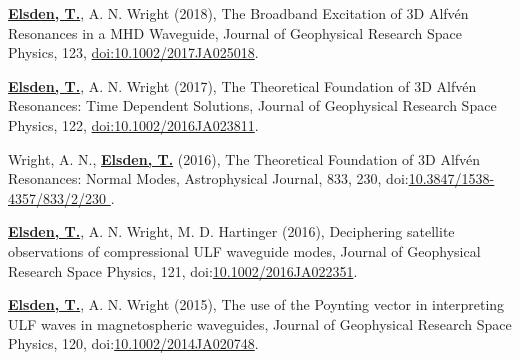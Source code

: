 \documentclass[11pt,a4paper]{article} %
\newcommand\vs{\vspace{-0.25cm}}
\begin{document}
\begin{etaremune}
\vs
\item \underline{\textbf{Elsden, T.}}, A. N. Wright (2018),  The Broadband Excitation of 3D Alfv\'{e}n Resonances in a MHD Waveguide, Journal of Geophysical Research Space Physics, 123, {\href{https://doi.org/10.1002/2017JA025018}{doi:10.1002/2017JA025018}}.

\vspace{-0.5cm}

\vs
\item \underline{\textbf{Elsden, T.}}, A. N. Wright (2017), The Theoretical Foundation of 3D Alfv\'{e}n Resonances: Time Dependent Solutions, Journal of Geophysical Research Space Physics, 122, {\href{http://onlinelibrary.wiley.com/doi/10.1002/2016JA023811/full}{doi:10.1002/2016JA023811}}.

\vspace{-0.5cm}

\vs
\item Wright, A. N., \underline{\textbf{Elsden, T.}} (2016), The Theoretical Foundation of 3D Alfv\'{e}n Resonances: Normal Modes, Astrophysical Journal, 833, 230, doi:{\href{http://iopscience.iop.org/article/10.3847/1538-4357/833/2/230}{10.3847/1538-4357/833/2/230 }}.

\vs
\item \underline{\textbf{Elsden, T.}}, A. N. Wright, M. D. Hartinger (2016), Deciphering satellite observations of compressional ULF waveguide modes, Journal of Geophysical Research Space Physics, 121, doi:{\href{http://onlinelibrary.wiley.com/doi/10.1002/2016JA022351/full}{10.1002/2016JA022351}}.

\vspace{-0.5cm}

\vs
\item \underline{\textbf{Elsden, T.}}, A. N. Wright (2015), The use of the Poynting vector in interpreting ULF waves in magnetospheric waveguides, Journal of Geophysical Research Space Physics, 120, doi:{\href{http://onlinelibrary.wiley.com/doi/10.1002/2014JA020748/abstract}{10.1002/2014JA020748}}.

\end{etaremune}

\end{document}
